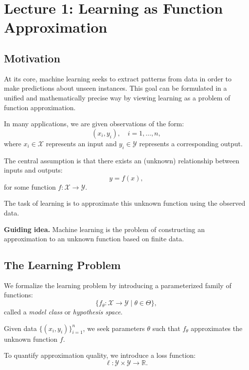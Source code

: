 \section{Lecture 1: Learning as Function Approximation}

\subsection{Motivation}

At its core, machine learning seeks to extract patterns from data in order to make predictions about unseen instances. This goal can be formulated in a unified and mathematically precise way by viewing learning as a problem of function approximation.

\medskip

\noindent
In many applications, we are given observations of the form:
\[
(x_i, y_i), \quad i = 1, \dots, n,
\]
where $x_i \in \mathcal{X}$ represents an input and $y_i \in \mathcal{Y}$ represents a corresponding output.

\medskip

\noindent
The central assumption is that there exists an (unknown) relationship between inputs and outputs:
\[
y = f(x),
\]
for some function $f : \mathcal{X} \to \mathcal{Y}$.

\medskip

\noindent
The task of learning is to approximate this unknown function using the observed data.

\medskip

\noindent
\textbf{Guiding idea.}  
Machine learning is the problem of constructing an approximation to an unknown function based on finite data.

\subsection{The Learning Problem}

We formalize the learning problem by introducing a parameterized family of functions:
\[
\{ f_\theta : \mathcal{X} \to \mathcal{Y} \mid \theta \in \Theta \},
\]
called a \emph{model class} or \emph{hypothesis space}.

\medskip

\noindent
Given data $\{(x_i, y_i)\}_{i=1}^n$, we seek parameters $\theta$ such that $f_\theta$ approximates the unknown function $f$.

\medskip

\noindent
To quantify approximation quality, we introduce a loss function:
\[
\ell : \mathcal{Y} \times \mathcal{Y} \to \mathbb{R}.
\]

